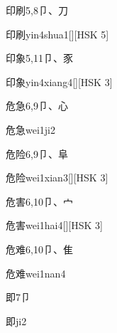 \begin{entry}{印刷}{5,8}{⼙、⼑}
  \begin{phonetics}{印刷}{yin4shua1}[][HSK 5]
  \end{phonetics}
\end{entry}

\begin{entry}{印象}{5,11}{⼙、⾗}
  \begin{phonetics}{印象}{yin4xiang4}[][HSK 3]
  \end{phonetics}
\end{entry}

\begin{entry}{危急}{6,9}{⼙、⼼}
  \begin{phonetics}{危急}{wei1ji2}
  \end{phonetics}
\end{entry}

\begin{entry}{危险}{6,9}{⼙、⾩}
  \begin{phonetics}{危险}{wei1xian3}[][HSK 3]
  \end{phonetics}
\end{entry}

\begin{entry}{危害}{6,10}{⼙、⼧}
  \begin{phonetics}{危害}{wei1hai4}[][HSK 3]
  \end{phonetics}
\end{entry}

\begin{entry}{危难}{6,10}{⼙、⾫}
  \begin{phonetics}{危难}{wei1nan4}
  \end{phonetics}
\end{entry}

\begin{entry}{即}{7}{⼙}
  \begin{phonetics}{即}{ji2}
  \end{phonetics}
\end{entry}

